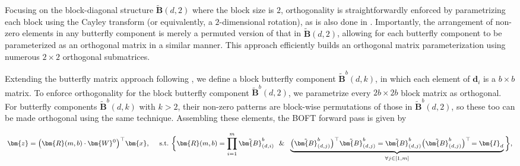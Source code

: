 Focusing on the block-diagonal structure $\tilde{\bm{B}}(d,2)$ where the block size is $2$, orthogonality is straightforwardly enforced by parametrizing each block using the Cayley transform (or equivalently, a $2$-dimensional rotation), as is also done in \cite{liu2021orthogonal,qiu2023controlling}. Importantly, the arrangement of non-zero elements in any butterfly component is merely a permuted version of that in $\tilde{\bm{B}}(d,2)$, allowing for each butterfly component to be parameterized as an orthogonal matrix in a similar manner. This approach efficiently builds an orthogonal matrix parameterization using numerous $2\times 2$ orthogonal submatrices. 

Extending the butterfly matrix approach following \cite{chen2022pixelated}, we define a block butterfly component $\tilde{\bm{B}}^b(d,k)$, in which each element of $\bm{d}_i$ is a $b\times b$ matrix. To enforce orthogonality for the block butterfly component $\tilde{\bm{B}}^b(d,2)$, we parametrize every $2b\times 2b$ block matrix as orthogonal. For butterfly components $\tilde{\bm{B}}^b(d,k)$ with $k>2$, their non-zero patterns are block-wise permutations of those in $\tilde{\bm{B}}^b(d,2)$, so these too can be made orthogonal using the same technique. Assembling these elements, the BOFT forward pass is given by

\begin{equation}
    \footnotesize
    \begin{aligned}\nonumber
    \bm{z}=\big(\bm{R}(m,b)\cdot\bm{W}^0\big)^\top\bm{x},~~~~\text{s.t.}~\bigg{\{}\bm{R}(m,b)=\prod_{i=1}^m \tilde{\bm{B}}^b_{(d,i)}~~\&~~\underbrace{\big(\tilde{\bm{B}}^b_{(d,j)}\big)^\top\tilde{\bm{B}}^b_{(d,j)}=\tilde{\bm{B}}^b_{(d,j)}\big(\tilde{\bm{B}}^b_{(d,j)}\big)^\top\!=\bm{I}_d}_{\forall j\in [1, m]}\bigg{\}},
    \end{aligned}
\end{equation}

